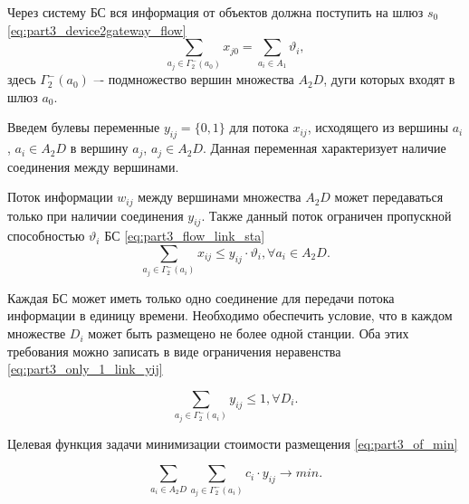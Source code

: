 Через систему БС вся информация от объектов  должна поступить на шлюз $s_0$ \cref{eq:part3_device2gateway_flow} 
\begin{equation}\label{eq:part3_device2gateway_flow}
    \sum_{a_j \in \Gamma_2^-(a_0)} x_{j0} = \sum_{a_i \in A_1} \vartheta_i,
\end{equation}
здесь $\Gamma_2^-(a_0)$ –- подмножество вершин множества $A_2D$, дуги которых входят в шлюз $a_0$.

Введем булевы переменные $y_{ij} = \{0,1\}$ для потока $x_{ij}$, исходящего из вершины $a_i$, $a_i \in A_2D$ в вершину $a_j$, $a_j \in A_2D$. Данная переменная характеризует наличие соединения между вершинами.

Поток информации $w_{ij}$ между вершинами множества $A_2D$ может передаваться только при наличии соединения $y_{ij}$. Также данный поток ограничен пропускной способностью $\vartheta_i$ БС  \cref{eq:part3_flow_link_sta}
\begin{equation}\label{eq:part3_flow_link_sta}
    \sum_{a_j \in \Gamma_2^-(a_i)} x_{ij} \leqslant y_{ij} \cdot \vartheta_i, \forall a_i \in A_2D.
\end{equation}

Каждая БС может иметь только одно соединение для передачи потока информации в единицу времени. Необходимо обеспечить условие, что в каждом множестве $D_i$ может быть размещено не более одной станции. Оба этих требования можно записать в виде ограничения неравенства \cref{eq:part3_only_1_link_yij}

\begin{equation}\label{eq:part3_only_1_link_yij}
    \sum_{a_j \in \Gamma_2^-(a_i)} y_{ij} \leqslant 1, \forall D_i.
\end{equation}

Целевая функция задачи минимизации стоимости размещения \cref{eq:part3_of_min}

\begin{equation}\label{eq:part3_of_min}
    \sum_{a_i \in A_2D} \sum_{a_j \in \Gamma_2^-(a_i)}c_i \cdot y_{ij} \to min.
\end{equation}


